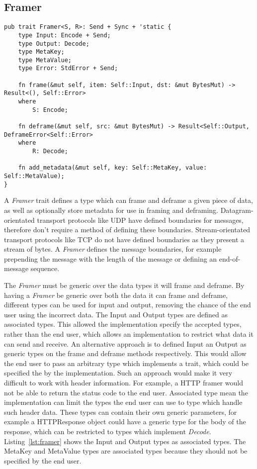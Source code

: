 \subsection{Framer}\label{subsec:framer}
\begin{lstlisting}[float=h, label=lst:framer, caption={The Framer trait, showing the Send and 'static
requirements for all implementers, and associated types.}]
pub trait Framer<S, R>: Send + Sync + 'static {
    type Input: Encode + Send;
    type Output: Decode;
    type MetaKey;
    type MetaValue;
    type Error: StdError + Send;

    fn frame(&mut self, item: Self::Input, dst: &mut BytesMut) -> Result<(), Self::Error>
    where
        S: Encode;

    fn deframe(&mut self, src: &mut BytesMut) -> Result<Self::Output, DeframeError<Self::Error>
    where
        R: Decode;

    fn add_metadata(&mut self, key: Self::MetaKey, value: Self::MetaValue);
}
\end{lstlisting}

A \emph{Framer} trait defines a type which can frame and deframe a given piece of data, as well as optionally store
metadata for use in framing and deframing.
Datagram-orientated transport protocols like UDP have defined boundaries for messages, therefore don't require a method
of defining these boundaries.
Stream-orientated transport protocols like TCP do not have defined boundaries as they present a stream of bytes.
A \emph{Framer} defines the message boundaries, for example prepending the message with the length of the message or
defining an end-of-message sequence.

The \emph{Framer} must be generic over the data types it will frame and deframe.
By having a \emph{Framer} be generic over both the data it can frame and deframe, different types can be used for input
and output, removing the chance of the end user using the incorrect data.
The Input and Output types are defined as associated types.
This allowed the implementation specify the accepted types, rather than the end user, which allows an implementation to
restrict what data it can send and receive.
An alternative approach is to defined Input an Output as generic types on the frame and deframe methods respectively.
This would allow the end user to pass an arbitrary type which implements a trait, which could be specified the by
the implementation.
Such an approach would make it very difficult to work with header information.
For example, a HTTP framer would not be able to return the status code to the end user.
Associated type mean the implementation can limit the types the end user can use to type which handle such header data.
These types can contain their own generic parameters, for example a HTTPResponse object could have a generic type for
the body of the response, which can be restricted to types which implement \emph{Decode}.
Listing~\ref{lst:framer} shows the Input and Output types as associated types.
The MetaKey and MetaValue types are associated types because they should not be specified by the end user.

